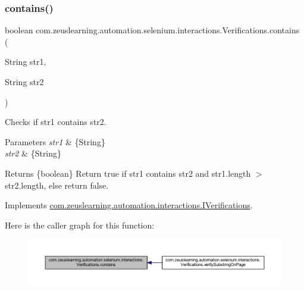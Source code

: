 \subsubsection{\texorpdfstring{contains()}{contains()}}
{\footnotesize\ttfamily boolean com.\+zeuslearning.\+automation.\+selenium.\+interactions.\+Verifications.\+contains (\begin{DoxyParamCaption}\item[{String}]{str1,  }\item[{String}]{str2 }\end{DoxyParamCaption})\hspace{0.3cm}{\ttfamily [inline]}}

Checks if str1 contains str2.


\begin{DoxyParams}{Parameters}
{\em str1} & \{String\} \\
\hline
{\em str2} & \{String\} \\
\hline
\end{DoxyParams}
\begin{DoxyReturn}{Returns}
\{boolean\} Return true if str1 contains str2 and str1.\+length $>$ str2.\+length, else return false. 
\end{DoxyReturn}


Implements \hyperlink{interfacecom_1_1zeuslearning_1_1automation_1_1interactions_1_1IVerifications_aa130fde03f220efd0733c6481afa9b94}{com.\+zeuslearning.\+automation.\+interactions.\+I\+Verifications}.

Here is the caller graph for this function\+:
\nopagebreak
\begin{figure}[H]
\begin{center}
\leavevmode
\includegraphics[width=350pt]{d2/d6b/classcom_1_1zeuslearning_1_1automation_1_1selenium_1_1interactions_1_1Verifications_a5e29c5310810934f0e069203e35e31bc_icgraph}
\end{center}
\end{figure}
\hypertarget{classcom_1_1zeuslearning_1_1automation_1_1selenium_1_1interactions_1_1Verifications_a1719b6ad2358f7e080119d4cfa911ad8}{}\label{classcom_1_1zeuslearning_1_1automation_1_1selenium_1_1interactions_1_1Verifications_a1719b6ad2358f7e080119d4cfa911ad8} 
